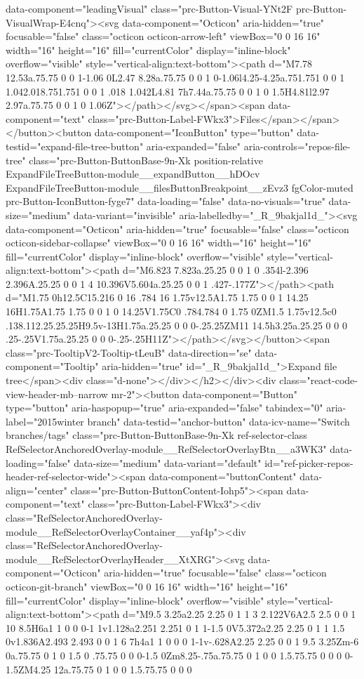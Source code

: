 {{{{{data-component="leadingVisual" class="prc-Button-Visual-YNt2F prc-Button-VisualWrap-E4cnq"><svg data-component="Octicon" aria-hidden="true" focusable="false" class="octicon octicon-arrow-left" viewBox="0 0 16 16" width="16" height="16" fill="currentColor" display="inline-block" overflow="visible" style="vertical-align:text-bottom"><path d="M7.78 12.53a.75.75 0 0 1-1.06 0L2.47 8.28a.75.75 0 0 1 0-1.06l4.25-4.25a.751.751 0 0 1 1.042.018.751.751 0 0 1 .018 1.042L4.81 7h7.44a.75.75 0 0 1 0 1.5H4.81l2.97 2.97a.75.75 0 0 1 0 1.06Z"></path></svg></span><span data-component="text" class="prc-Button-Label-FWkx3">Files</span></span></button><button data-component="IconButton" type="button" data-testid="expand-file-tree-button" aria-expanded="false" aria-controls="repos-file-tree" class="prc-Button-ButtonBase-9n-Xk position-relative ExpandFileTreeButton-module__expandButton__hDOcv ExpandFileTreeButton-module__filesButtonBreakpoint__zEvz3 fgColor-muted prc-Button-IconButton-fyge7" data-loading="false" data-no-visuals="true" data-size="medium" data-variant="invisible" aria-labelledby="_R_9bakjal1d_"><svg data-component="Octicon" aria-hidden="true" focusable="false" class="octicon octicon-sidebar-collapse" viewBox="0 0 16 16" width="16" height="16" fill="currentColor" display="inline-block" overflow="visible" style="vertical-align:text-bottom"><path d="M6.823 7.823a.25.25 0 0 1 0 .354l-2.396 2.396A.25.25 0 0 1 4 10.396V5.604a.25.25 0 0 1 .427-.177Z"></path><path d="M1.75 0h12.5C15.216 0 16 .784 16 1.75v12.5A1.75 1.75 0 0 1 14.25 16H1.75A1.75 1.75 0 0 1 0 14.25V1.75C0 .784.784 0 1.75 0ZM1.5 1.75v12.5c0 .138.112.25.25.25H9.5v-13H1.75a.25.25 0 0 0-.25.25ZM11 14.5h3.25a.25.25 0 0 0 .25-.25V1.75a.25.25 0 0 0-.25-.25H11Z"></path></svg></button><span class="prc-TooltipV2-Tooltip-tLeuB" data-direction="se" data-component="Tooltip" aria-hidden="true" id="_R_9bakjal1d_">Expand file tree</span><div class="d-none"></div></h2></div><div class="react-code-view-header-mb--narrow mr-2"><button data-component="Button" type="button" aria-haspopup="true" aria-expanded="false" tabindex="0" aria-label="2015winter branch" data-testid="anchor-button" data-icv-name="Switch branches/tags" class="prc-Button-ButtonBase-9n-Xk ref-selector-class RefSelectorAnchoredOverlay-module__RefSelectorOverlayBtn__a3WK3" data-loading="false" data-size="medium" data-variant="default" id="ref-picker-repos-header-ref-selector-wide"><span data-component="buttonContent" data-align="center" class="prc-Button-ButtonContent-Iohp5"><span data-component="text" class="prc-Button-Label-FWkx3"><div class="RefSelectorAnchoredOverlay-module__RefSelectorOverlayContainer__yaf4p"><div class="RefSelectorAnchoredOverlay-module__RefSelectorOverlayHeader__XtXRG"><svg data-component="Octicon" aria-hidden="true" focusable="false" class="octicon octicon-git-branch" viewBox="0 0 16 16" width="16" height="16" fill="currentColor" display="inline-block" overflow="visible" style="vertical-align:text-bottom"><path d="M9.5 3.25a2.25 2.25 0 1 1 3 2.122V6A2.5 2.5 0 0 1 10 8.5H6a1 1 0 0 0-1 1v1.128a2.251 2.251 0 1 1-1.5 0V5.372a2.25 2.25 0 1 1 1.5 0v1.836A2.493 2.493 0 0 1 6 7h4a1 1 0 0 0 1-1v-.628A2.25 2.25 0 0 1 9.5 3.25Zm-6 0a.75.75 0 1 0 1.5 0 .75.75 0 0 0-1.5 0Zm8.25-.75a.75.75 0 1 0 0 1.5.75.75 0 0 0 0-1.5ZM4.25 12a.75.75 0 1 0 0 1.5.75.75 0 0 0 }}}}}
